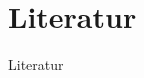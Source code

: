 \documentclass[aspectratio=1610, 9pt]{beamer}
\begin{document}
%

\section{Literatur}
\begin{frame}[allowframebreaks]{Literatur}
  \printbibliography
\end{frame}
\end{document}
